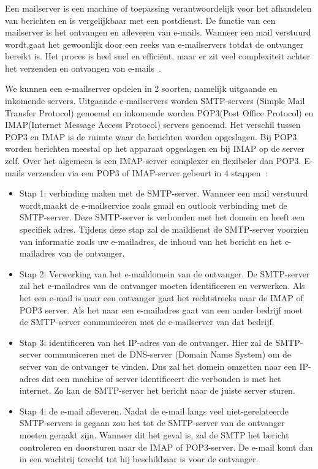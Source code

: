 \subsubsection{}
\label{subsubsec:Mailserver}
Een mailserver is een machine of toepassing verantwoordelijk voor het afhandelen van berichten en is vergelijkbaar met een postdienst. De functie van een mailserver is het ontvangen en afleveren van e-mails. Wanneer een mail verstuurd wordt,gaat het gewoonlijk door een reeks van e-mailservers totdat de ontvanger bereikt is. Het proces is heel snel en efficiënt, maar er zit veel complexiteit achter het verzenden en ontvangen van e-mails~\autocite{Gatefy2021}.

We kunnen een e-mailserver opdelen in 2 soorten, namelijk uitgaande en inkomende servers. Uitgaande e-mailservers worden SMTP-servers (Simple Mail Transfer Protocol) genoemd en inkomende worden POP3(Post Office Protocol) en IMAP(Internet Message Access Protocol) servers genoemd. Het verschil tussen POP3 en IMAP is de ruimte waar de berichten worden opgeslagen. Bij POP3 worden berichten meestal op het apparaat opgeslagen en bij IMAP op de server zelf. Over het algemeen is een IMAP-server complexer en flexibeler dan POP3. E-mails verzenden via een POP3 of IMAP-server gebeurt in 4 stappen~\autocite{Gatefy2021}:
\begin{itemize}
    \item Stap 1: verbinding maken met de SMTP-server. Wanneer een mail verstuurd wordt,maakt de e-mailservice zoals gmail en outlook verbinding met de SMTP-server. Deze SMTP-server is verbonden met het domein en heeft een specifiek adres. Tijdens deze stap zal de maildienst de SMTP-server voorzien van informatie zoals uw e-mailadres, de inhoud van het bericht en het e-mailadres van de ontvanger.
    \item Stap 2: Verwerking van het e-maildomein van de ontvanger. De SMTP-server zal het e-mailadres van de ontvanger moeten identificeren en verwerken. Als het een e-mail is naar een ontvanger gaat het rechtstreeks naar de IMAP of POP3 server. Als het naar een e-mailadres gaat van een ander bedrijf moet de SMTP-server communiceren met de e-mailserver van dat bedrijf. 
    \item Stap 3: identificeren van het IP-adres van de ontvanger. Hier zal de SMTP-server communiceren met de DNS-server (Domain Name System) om de server van de ontvanger te vinden. Dns zal het domein omzetten naar een IP-adres dat een machine of server identificeert die verbonden is met het internet. Zo kan de SMTP-server het bericht naar de juiste server sturen.
    \item Stap 4: de e-mail afleveren. Nadat de e-mail langs veel niet-gerelateerde SMTP-servers is gegaan zou het tot de SMTP-server van de ontvanger moeten geraakt zijn. Wanneer dit het geval is, zal de SMTP het bericht controleren en doorsturen naar de IMAP of POP3-server. De e-mail komt dan in een wachtrij terecht tot  hij beschikbaar is voor de ontvanger. 
\end{itemize}

